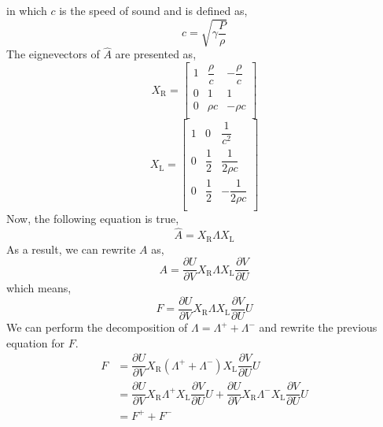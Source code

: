 \documentclass{article}
\begin{document}
in which $c$ is the speed of sound and is defined as,
\begin{equation*}
c=\sqrt{\gamma \dfrac{P}{\rho}}
\end{equation*}
The eignevectors of $\hat{A}$ are presented as,
\begin{equation*}
X_{\text{R}}=
\left[
\begin{matrix}
1 & \dfrac{\rho}{c} & -\dfrac{\rho}{c} \\[10pt]
0 & 1 & 1 \\[10pt]
0 & \rho c & -\rho c \\
\end{matrix}
\right]
\end{equation*}
\begin{equation*}
X_{\text{L}}=
\left[
\begin{matrix}
1 & 0 & \dfrac{1}{c^2} \\[10pt]
0 & \dfrac{1}{2} & \dfrac{1}{2\rho c} \\[10pt]
0 & \dfrac{1}{2} & -\dfrac{1}{2\rho c} \\
\end{matrix}
\right]
\end{equation*}
Now, the following equation is true,
\begin{equation*}
\hat{A}=X_{\text{R}} \Lambda X_{\text{L}}
\end{equation*}
As a result, we can rewrite $A$ as,
\begin{equation*}
A=\dfrac{\partial U}{\partial V}X_{\text{R}} \Lambda X_{\text{L}}\dfrac{\partial V}{\partial U}
\end{equation*}
which means,
\begin{equation*}
F=\dfrac{\partial U}{\partial V}X_{\text{R}} \Lambda X_{\text{L}}\dfrac{\partial V}{\partial U} U
\end{equation*}
We can perform the decomposition of $\Lambda = \Lambda^+ + \Lambda^-$ and rewrite the previous equation for $F$.
\begin{equation*}
\begin{split}
F&=\dfrac{\partial U}{\partial V}X_{\text{R}} \left( \Lambda^+ + \Lambda^- \right)X_{\text{L}}\dfrac{\partial V}{\partial U} U \\
&= \dfrac{\partial U}{\partial V}X_{\text{R}} \Lambda^+ X_{\text{L}}\dfrac{\partial V}{\partial U} U +\dfrac{\partial U}{\partial V}X_{\text{R}}  \Lambda^- X_{\text{L}}\dfrac{\partial V}{\partial U} U \\
& =F^+ +F^-
\end{split}
\end{equation*}
\end{document}
